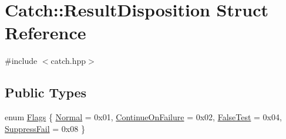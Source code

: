 \hypertarget{structCatch_1_1ResultDisposition}{\section{Catch\-:\-:Result\-Disposition Struct Reference}
\label{structCatch_1_1ResultDisposition}
}


{\ttfamily \#include $<$catch.\-hpp$>$}

\subsection*{Public Types}
\begin{DoxyCompactItemize}
\item 
enum \hyperlink{structCatch_1_1ResultDisposition_a3396cad6e2259af326b3aae93e23e9d8}{Flags} \{ \hyperlink{structCatch_1_1ResultDisposition_a3396cad6e2259af326b3aae93e23e9d8af3bd52347ed6f8796e8ce2f77bb39ea5}{Normal} = 0x01, 
\hyperlink{structCatch_1_1ResultDisposition_a3396cad6e2259af326b3aae93e23e9d8aa18c94bd60c5614e17a84c2ced3bbfd5}{Continue\-On\-Failure} = 0x02, 
\hyperlink{structCatch_1_1ResultDisposition_a3396cad6e2259af326b3aae93e23e9d8a9980604245f19884691f941dec03eeb8}{False\-Test} = 0x04, 
\hyperlink{structCatch_1_1ResultDisposition_a3396cad6e2259af326b3aae93e23e9d8a1a88eb6004bddee4ccae4b421991bf54}{Suppress\-Fail} = 0x08
 \}
\end{DoxyCompactItemize}



